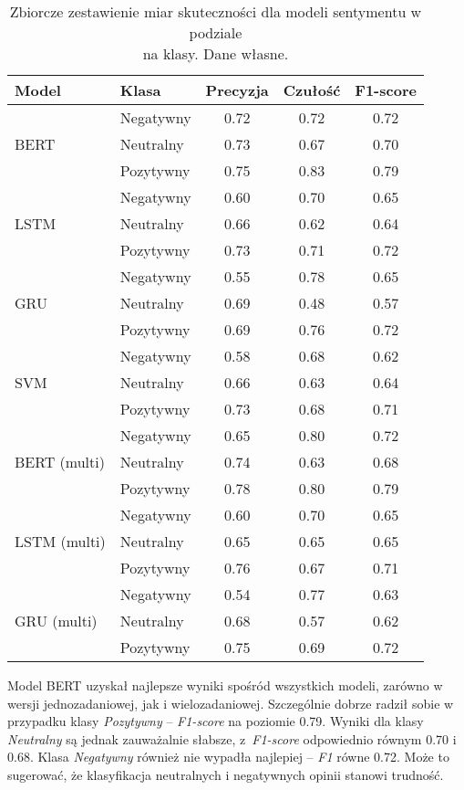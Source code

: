 \begin{table}[H]
\centering
\begin{tabular}{|l|l|c|c|c|}
\hline
\textbf{Model} & \textbf{Klasa} & \textbf{Precyzja} & \textbf{Czułość} & \textbf{F1-score} \\
\hline
\multirow{3}{*}{BERT} 
& Negatywny & 0.72 & 0.72 & 0.72 \\
& Neutralny & 0.73 & 0.67 & 0.70 \\
& Pozytywny & 0.75 & 0.83 & 0.79 \\
\hline
\multirow{3}{*}{LSTM} 
& Negatywny & 0.60 & 0.70 & 0.65 \\
& Neutralny & 0.66 & 0.62 & 0.64 \\
& Pozytywny & 0.73 & 0.71 & 0.72 \\
\hline
\multirow{3}{*}{GRU} 
& Negatywny & 0.55 & 0.78 & 0.65 \\
& Neutralny & 0.69 & 0.48 & 0.57 \\
& Pozytywny & 0.69 & 0.76 & 0.72 \\
\hline
\multirow{3}{*}{SVM} 
& Negatywny & 0.58 & 0.68 & 0.62 \\
& Neutralny & 0.66 & 0.63 & 0.64 \\
& Pozytywny & 0.73 & 0.68 & 0.71 \\
\hline
\multirow{3}{*}{BERT (multi)} 
& Negatywny & 0.65 & 0.80 & 0.72 \\
& Neutralny & 0.74 & 0.63 & 0.68 \\
& Pozytywny & 0.78 & 0.80 & 0.79 \\
\hline
\multirow{3}{*}{LSTM (multi)} 
& Negatywny & 0.60 & 0.70 & 0.65 \\
& Neutralny & 0.65 & 0.65 & 0.65 \\
& Pozytywny & 0.76 & 0.67 & 0.71 \\
\hline
\multirow{3}{*}{GRU (multi)} 
& Negatywny & 0.54 & 0.77 & 0.63 \\
& Neutralny & 0.68 & 0.57 & 0.62 \\
& Pozytywny & 0.75 & 0.69 & 0.72 \\
\hline
\end{tabular}
\caption{Zbiorcze zestawienie miar skuteczności dla modeli sentymentu w podziale\\na klasy. Dane własne.}
\label{tab:sentiment_per_model}
\end{table}

Model BERT uzyskał najlepsze wyniki spośród wszystkich modeli, zarówno w wersji jednozadaniowej, jak i wielozadaniowej. Szczególnie dobrze radził sobie w przypadku klasy \textit{Pozytywny} -- \textit{F1-score} na poziomie 0.79. Wyniki dla klasy \textit{Neutralny} są jednak zauważalnie słabsze, z~\textit{F1-score} odpowiednio równym 0.70 i 0.68. Klasa \textit{Negatywny} również nie wypadła najlepiej – \textit{F1} równe 0.72. Może to sugerować, że klasyfikacja neutralnych i negatywnych opinii stanowi trudność.

